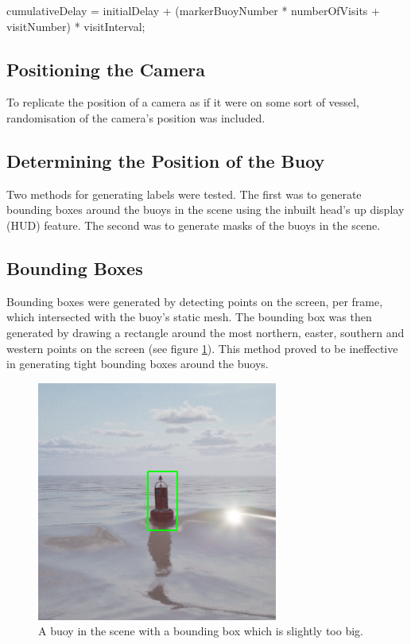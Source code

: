 \documentclass[10pt,twocolumn,letterpaper]{article}
\begin{document}
cumulativeDelay = initialDelay + (markerBuoyNumber * numberOfVisits + visitNumber) * visitInterval;
 

\subsection{Positioning the Camera} \label {sec:positioning_the_camera}

To replicate the position of a camera as if it were on some sort of vessel, randomisation of the camera's position was included.

\subsection{Determining the Position of the Buoy}

Two methods for generating labels were tested. The first was to generate bounding boxes around the buoys in the scene using the inbuilt head's up display (HUD) feature. The second was to generate masks of the buoys in the scene. 

\subsection{Bounding Boxes}

Bounding boxes were generated by detecting points on the screen, per frame, which intersected with the buoy's static mesh. The bounding box was then generated by drawing a rectangle around the most northern, easter, southern and western points on the screen (see figure \ref{fig:buoy_with_bounding_box}). This method proved to be ineffective in generating tight bounding boxes around the buoys.

\begin{figure}[t]
    \centering
    \includegraphics[width=\linewidth]{images/buoy_with_bounding_box.png}
    \caption{A buoy in the scene with a bounding box which is slightly too big.}
    \label{fig:buoy_with_bounding_box}
\end{figure}
\end{document}
